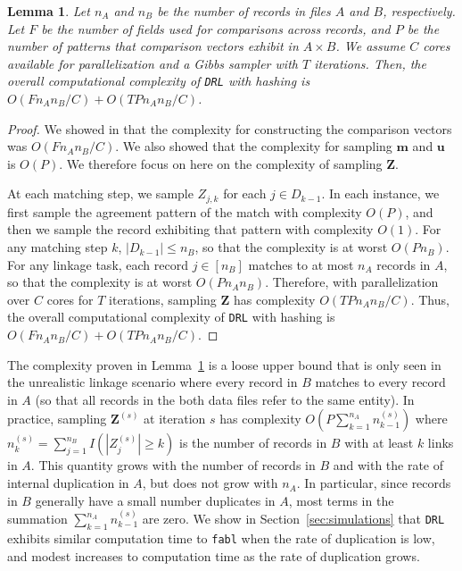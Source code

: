 \documentclass[12pt,letterpaper]{article}
\newcommand{\1}[1]{\mathbb{I}\!\left[#1\right]} %
\newtheorem{lemma}{Lemma}
\begin{document}
\begin{lemma}\label{lemma:complexity}
	Let $n_A$ and $n_B$ be the number of records in files $A$ and $B$, respectively. Let $F$ be the number of fields used for comparisons across records, and $P$ be the number of patterns that comparison vectors exhibit in $A \times B$. We assume $C$ cores available for parallelization and a Gibbs sampler with $T$ iterations. Then, the overall computational complexity of \texttt{DRL} with hashing is $O(F n_A n_B /C) + O(T P n_A n_B / C)$.
\end{lemma}
\begin{proof}
	We showed in \cite{kundinger_2023} that the complexity for constructing the comparison vectors was $O(F n_A n_B /C)$. We also showed that the complexity for sampling $\bm{m}$ and $\bm{u}$ is $O(P)$. We therefore focus on here on the complexity of sampling $\bm{Z}$. 
	
	At each matching step, we sample $Z_{j,k}$ for each $j \in D_{k-1}$. In each instance, we first sample the agreement pattern of the match with complexity $O(P)$, and then we sample the record exhibiting that pattern with complexity $O(1)$. For any matching step $k$, $|D_{k-1}| \leq n_B$, so that the complexity is at worst $O(P n_B)$. For any linkage task, each record $j \in [n_B]$ matches to at most $n_A$ records in $A$, so that the complexity is at worst $O(P n_A n_B)$. Therefore, with parallelization over $C$ cores for $T$ iterations, sampling $\bm{Z}$ has complexity $O(T P n_A n_B / C).$ Thus, the overall computational complexity of \texttt{DRL} with hashing is $O(F n_A n_B /C) + O(T P n_A n_B / C)$.
\end{proof}

The complexity proven in Lemma~\ref{lemma:complexity} is a loose upper bound that is only seen in the unrealistic linkage scenario where every record in $B$ matches to every record in $A$ (so that all records in the both data files refer to the same entity). In practice, sampling $\bm{Z}^{(s)}$ at iteration $s$ has complexity $O\left(P \sum_{k=1}^{n_A} n_{k-1}^{(s)}\right)$ where $n_k^{(s)} = \sum_{j=1}^{n_B} I(|Z_j^{(s)}| \geq k)$ is the number of records in $B$ with at least $k$ links in $A$. This quantity grows with the number of records in $B$ and with the rate of internal duplication in $A$, but does not grow with $n_A$. In particular, since records in $B$ generally have a small number duplicates in $A$, most terms in the summation  $\sum_{k=1}^{n_A} n_{k-1}^{(s)}$ are zero. We show in Section~\ref{sec:simulations} that \texttt{DRL} exhibits similar computation time to \texttt{fabl} when the rate of duplication is low, and modest increases to computation time as the rate of duplication grows. 
\end{document}
